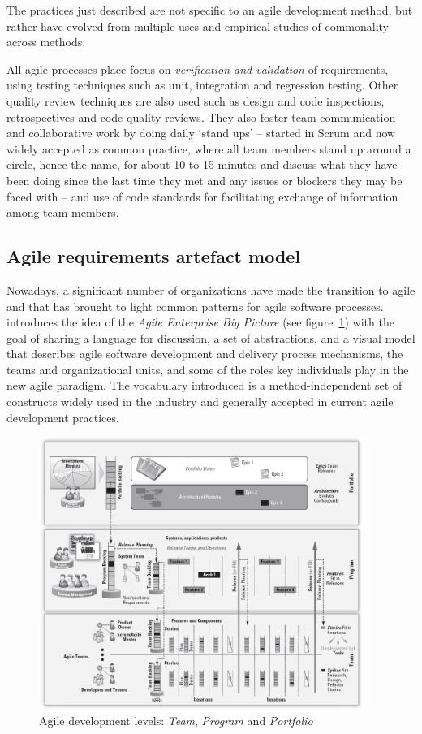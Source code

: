 \documentclass[dissertation,final]{softeng}
\begin{document}
The practices just described are not specific to an agile development method, but rather have evolved from multiple uses and empirical studies of commonality across methods.

All agile processes place focus on \emph{verification and validation} of requirements, using testing techniques such as unit, integration and regression testing. Other quality review techniques are also used such as design and code inspections, retrospectives and code quality reviews. They also foster team communication and collaborative work by doing daily `stand ups' -- started in Scrum and now widely accepted as common practice, where all team members stand up around a circle, hence the name, for about 10 to 15 minutes and discuss what they have been doing since the last time they met and any issues or blockers they may be faced with -- and use of code standards for facilitating exchange of information among team members.

\subsection{Agile requirements artefact model}
Nowadays, a significant number of organizations have made the transition to agile and that has brought to light common patterns for agile software processes. ~\citet{Leffingwell2011} introduces the idea of the \emph{Agile Enterprise Big Picture} (see figure~\ref{fig:scaled_agile_framework}) with the goal of sharing a language for discussion, a set of abstractions, and a visual model that describes agile software development and delivery process mechanisms, the teams and organizational units, and some of the roles key individuals play in the new agile paradigm. The vocabulary introduced is a method-independent set of constructs widely used in the industry and generally accepted in current agile development practices.

\begin{figure}[h]
\includegraphics[width=0.95\textwidth]{ScaledAgileFrameworkbw}
\centering
\caption[Agile enterprise]{Agile development levels: \emph{Team}, \emph{Program} and \emph{Portfolio}~\citep{Leffingwell2011}}
\label{fig:scaled_agile_framework}
\end{figure}
\end{document}
